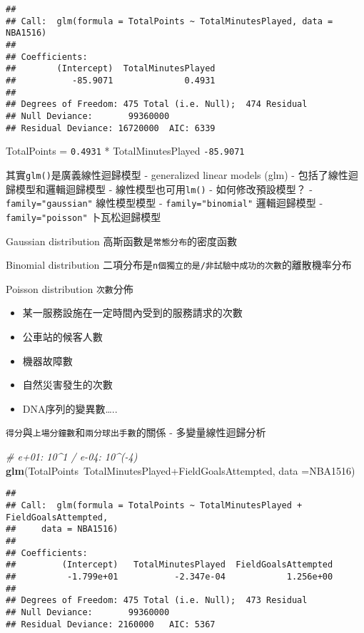 \documentclass[]{book}
\newenvironment{Shaded}{\begin{snugshade}}{\end{snugshade}}
\newcommand{\KeywordTok}[1]{\textcolor[rgb]{0.13,0.29,0.53}{\textbf{{#1}}}}
\newcommand{\DataTypeTok}[1]{\textcolor[rgb]{0.13,0.29,0.53}{{#1}}}
\newcommand{\CommentTok}[1]{\textcolor[rgb]{0.56,0.35,0.01}{\textit{{#1}}}}
\newcommand{\NormalTok}[1]{{#1}}
\providecommand{\tightlist}{%
  \setlength{\itemsep}{0pt}\setlength{\parskip}{0pt}}
\begin{document}
\begin{verbatim}
## 
## Call:  glm(formula = TotalPoints ~ TotalMinutesPlayed, data = NBA1516)
## 
## Coefficients:
##        (Intercept)  TotalMinutesPlayed  
##           -85.9071              0.4931  
## 
## Degrees of Freedom: 475 Total (i.e. Null);  474 Residual
## Null Deviance:       99360000 
## Residual Deviance: 16720000  AIC: 6339
\end{verbatim}

TotalPoints = \texttt{0.4931} * TotalMinutesPlayed \texttt{-85.9071}

其實\texttt{glm()}是廣義線性迴歸模型 - generalized linear models (glm) -
包括了線性迴歸模型和邏輯迴歸模型 - 線性模型也可用\texttt{lm()} -
如何修改預設模型？ - \texttt{family="gaussian"} 線性模型模型 -
\texttt{family="binomial"} 邏輯迴歸模型 - \texttt{family="poisson"}
卜瓦松迴歸模型

Gaussian distribution 高斯函數是\texttt{常態分布}的密度函數

Binomial distribution
二項分布是\texttt{n個獨立的是/非試驗中成功的次數}的離散機率分布

Poisson distribution \texttt{次數}分佈

\begin{itemize}
\tightlist
\item
  某一服務設施在一定時間內受到的服務請求的次數
\item
  公車站的候客人數
\item
  機器故障數
\item
  自然災害發生的次數
\item
  DNA序列的變異數\ldots{}..
\end{itemize}

\texttt{得分}與\texttt{上場分鐘數}和\texttt{兩分球出手數}的關係 -
多變量線性迴歸分析

\begin{Shaded}
\begin{Highlighting}[]
\CommentTok{# e+01: 10^1 / e-04: 10^(-4)}
\KeywordTok{glm}\NormalTok{(TotalPoints~TotalMinutesPlayed+FieldGoalsAttempted,}
    \DataTypeTok{data =}\NormalTok{NBA1516)}
\end{Highlighting}
\end{Shaded}

\begin{verbatim}
## 
## Call:  glm(formula = TotalPoints ~ TotalMinutesPlayed + FieldGoalsAttempted, 
##     data = NBA1516)
## 
## Coefficients:
##         (Intercept)   TotalMinutesPlayed  FieldGoalsAttempted  
##          -1.799e+01           -2.347e-04            1.256e+00  
## 
## Degrees of Freedom: 475 Total (i.e. Null);  473 Residual
## Null Deviance:       99360000 
## Residual Deviance: 2160000   AIC: 5367
\end{verbatim}
\end{document}

